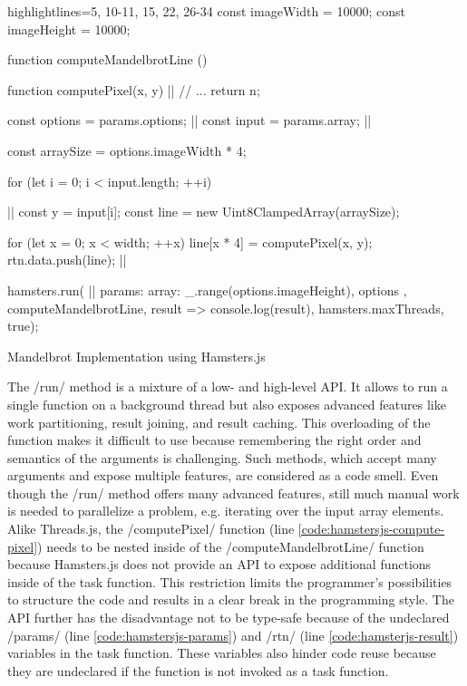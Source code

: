 \begin{listing}
\begin{javascriptcode*}{highlightlines={5, 10-11, 15, 22, 26-34}}
const imageWidth = 10000;
const imageHeight = 10000;

function computeMandelbrotLine () {
	function computePixel(x, y) {|$\label{code:hamstersjs-compute-pixel}$|
		// ...
		return n;
	}

	const options = params.options; |$\label{code:hamstersjs-params}$|
	const input = params.array; |$\label{code:hamstersjs-params-two}$|

	const arraySize = options.imageWidth * 4;

	for (let i = 0; i < input.length; ++i) {|$\label{code:hamsterjs-iterate}$|
		const y = input[i];
		const line = new Uint8ClampedArray(arraySize);
		
		for (let x = 0; x < width; ++x) {
			line[x * 4] = computePixel(x, y);
		}
		rtn.data.push(line); |$\label{code:hamsterjs-result}$|
	}
}

hamsters.run( |$\label{code:hamsterjs-start}$|
	params: {
		array: _.range(options.imageHeight),
		options
	},  
	computeMandelbrotLine, 
	result => console.log(result), 
	hamsters.maxThreads, 
	true);
\end{javascriptcode*}
\caption{Mandelbrot Implementation using Hamsters.js}
\label{fig:mandelbrot-hamsterjs}
\end{listing}

The \javascriptinline/run/ method is a mixture of a low- and high-level API. It allows to run a single function on a background thread but also exposes advanced features like work partitioning, result joining, and result caching. This overloading of the function makes it difficult to use because remembering the right order and semantics of the arguments is challenging. Such methods, which accept many arguments and expose multiple features, are considered as a code smell. Even though the \javascriptinline/run/ method offers many advanced features, still much manual work is needed to parallelize a problem, e.g. iterating over the input array elements. Alike Threads.js, the \javascriptinline/computePixel/ function (line \ref{code:hamstersjs-compute-pixel}) needs to be nested inside of the \javascriptinline/computeMandelbrotLine/ function because Hamsters.js does not provide an API to expose additional functions inside of the task function. This restriction limits the programmer's possibilities to structure the code and results in a clear break in the programming style. The API further has the disadvantage not to be type-safe because of the undeclared \javascriptinline/params/ (line \ref{code:hamstersjs-params}) and \javascriptinline/rtn/ (line \ref{code:hamsterjs-result}) variables in the task function. These variables also hinder code reuse because they are undeclared if the function is not invoked as a task function.

